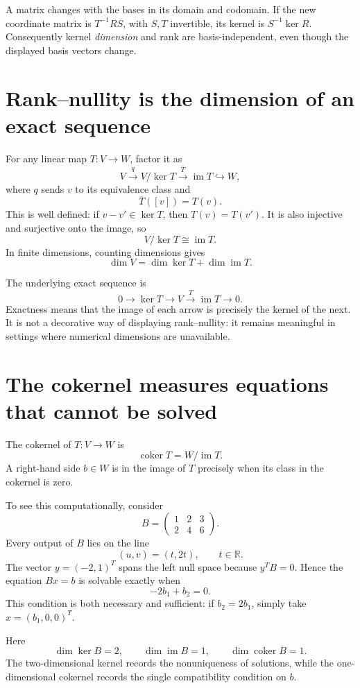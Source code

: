 A matrix changes with the bases in its domain and codomain. If the new coordinate matrix is \(T^{-1}RS\), with \(S,T\) invertible, its kernel is \(S^{-1}\ker R\). Consequently kernel \emph{dimension} and rank are basis-independent, even though the displayed basis vectors change.

\section{Rank--nullity is the dimension of an exact sequence}

For any linear map \(T:V\to W\), factor it as
\[
 V\xrightarrow{\ q\ }V/\ker T
 \xrightarrow{\ \overline T\ }\operatorname{im}T
 \hookrightarrow W,
\]
where \(q\) sends \(v\) to its equivalence class and
\[
 \overline T([v])=T(v).
\]
This is well defined: if \(v-v'\in\ker T\), then \(T(v)=T(v')\). It is also injective and surjective onto the image, so
\[
 \boxed{V/\ker T\cong\operatorname{im}T.}
\]
In finite dimensions, counting dimensions gives
\[
 \boxed{\dim V=\dim\ker T+\dim\operatorname{im}T.}
\]

The underlying exact sequence is
\[
 0\longrightarrow\ker T\longrightarrow V
 \xrightarrow{T}\operatorname{im}T\longrightarrow0.
\]
Exactness means that the image of each arrow is precisely the kernel of the next. It is not a decorative way of displaying rank--nullity: it remains meaningful in settings where numerical dimensions are unavailable.

\section{The cokernel measures equations that cannot be solved}

The cokernel of \(T:V\to W\) is
\[
 \operatorname{coker}T=W/\operatorname{im}T.
\]
A right-hand side \(b\in W\) is in the image of \(T\) precisely when its class in the cokernel is zero.

To see this computationally, consider
\[
 B=\begin{pmatrix}1&2&3\\2&4&6\end{pmatrix}.
\]
Every output of \(B\) lies on the line
\[
 (u,v)=(t,2t),\qquad t\in\mathbb R.
\]
The vector \(y=(-2,1)^T\) spans the left null space because \(y^TB=0\). Hence the equation \(Bx=b\) is solvable exactly when
\[
 \boxed{-2b_1+b_2=0.}
\]
This condition is both necessary and sufficient: if \(b_2=2b_1\), simply take \(x=(b_1,0,0)^T\).

Here
\[
 \dim\ker B=2,\qquad
 \dim\operatorname{im}B=1,\qquad
 \dim\operatorname{coker}B=1.
\]
The two-dimensional kernel records the nonuniqueness of solutions, while the one-dimensional cokernel records the single compatibility condition on \(b\).

